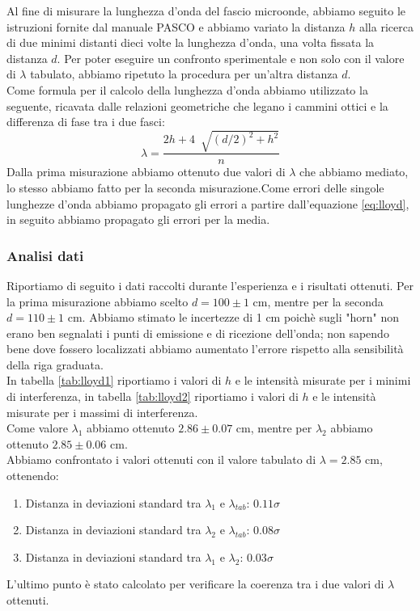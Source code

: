 \documentclass[letterpaper,12pt]{article}
\begin{document}
Al fine di misurare la lunghezza d'onda del fascio microonde, abbiamo seguito le istruzioni fornite dal manuale
PASCO e abbiamo variato la distanza $h$ alla ricerca di due minimi distanti dieci volte la lunghezza d'onda,
una volta fissata la distanza $d$. Per poter eseguire un confronto sperimentale e non solo con il valore di $\lambda$
tabulato, abbiamo ripetuto la procedura per un'altra distanza $d$. \\
Come formula per il calcolo della lunghezza d'onda abbiamo utilizzato la seguente, ricavata dalle relazioni geometriche
che legano i cammini ottici e la differenza di fase tra i due fasci:
\begin{equation}
	\lambda = \frac{2h + 4\ \sqrt[]{(d/2)^2 + h^2}}{n}
	\label{eq:lloyd}
\end{equation}
Dalla prima misurazione abbiamo ottenuto due valori di $\lambda$ che abbiamo mediato, lo stesso abbiamo fatto per
la seconda misurazione.Come errori delle singole lunghezze d'onda abbiamo propagato gli errori a partire dall'equazione
\ref{eq:lloyd}, in seguito abbiamo propagato gli errori per la media. \\


\subsubsection{Analisi dati}
Riportiamo di seguito i dati raccolti durante l'esperienza e i risultati ottenuti.
Per la prima misurazione abbiamo scelto $d = 100 \pm 1$ cm, mentre per la seconda $d = 110 \pm 1$ cm. Abbiamo stimato
le incertezze di 1 cm poichè sugli "horn" non erano ben segnalati i punti di emissione e di ricezione
dell'onda; non sapendo bene dove fossero localizzati abbiamo aumentato l'errore rispetto alla sensibilità della riga
graduata.\\
In tabella \ref{tab:lloyd1} riportiamo i valori di $h$ e le intensità misurate per i minimi di interferenza,
in tabella \ref{tab:lloyd2} riportiamo i valori di $h$ e le intensità misurate per i massimi di interferenza.\\
Come valore $\lambda_1$ abbiamo ottenuto $2.86 \pm 0.07$ cm, mentre per $\lambda_2$ abbiamo ottenuto $2.85 \pm 0.06$ cm.\\
Abbiamo confrontato i valori ottenuti con il valore tabulato di $\lambda = 2.85$ cm, ottenendo:
\begin{enumerate}
	\item Distanza in deviazioni standard tra $\lambda_1$ e $\lambda_{tab}$: $0.11 \sigma$
	\item Distanza in deviazioni standard tra $\lambda_2$ e $\lambda_{tab}$: $0.08 \sigma$
	\item Distanza in deviazioni standard tra $\lambda_1$ e $\lambda_2$: $0.03 \sigma$
\end{enumerate}
L'ultimo punto è stato calcolato per verificare la coerenza tra i due valori di $\lambda$ ottenuti.\\
\end{document}
